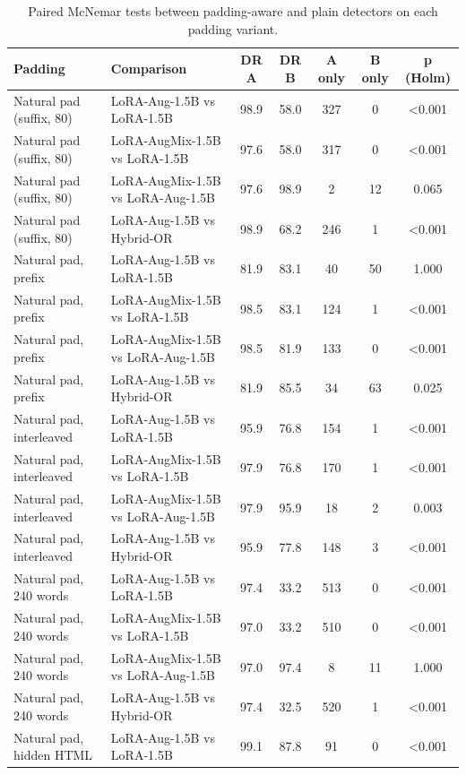 \begin{table}[t]
\centering
\caption{Paired McNemar tests between padding-aware and plain detectors on each padding variant.}
\label{tab:oodmcn}
\footnotesize
\begin{tabular}{llccccc}
\toprule
\textbf{Padding} & \textbf{Comparison} & \textbf{DR A} & \textbf{DR B} & \textbf{A only} & \textbf{B only} & \textbf{p (Holm)} \\
\midrule
Natural pad (suffix, 80) & LoRA-Aug-1.5B vs LoRA-1.5B & 98.9 & 58.0 & 327 & 0 & <0.001 \\
Natural pad (suffix, 80) & LoRA-AugMix-1.5B vs LoRA-1.5B & 97.6 & 58.0 & 317 & 0 & <0.001 \\
Natural pad (suffix, 80) & LoRA-AugMix-1.5B vs LoRA-Aug-1.5B & 97.6 & 98.9 & 2 & 12 & 0.065 \\
Natural pad (suffix, 80) & LoRA-Aug-1.5B vs Hybrid-OR & 98.9 & 68.2 & 246 & 1 & <0.001 \\
Natural pad, prefix & LoRA-Aug-1.5B vs LoRA-1.5B & 81.9 & 83.1 & 40 & 50 & 1.000 \\
Natural pad, prefix & LoRA-AugMix-1.5B vs LoRA-1.5B & 98.5 & 83.1 & 124 & 1 & <0.001 \\
Natural pad, prefix & LoRA-AugMix-1.5B vs LoRA-Aug-1.5B & 98.5 & 81.9 & 133 & 0 & <0.001 \\
Natural pad, prefix & LoRA-Aug-1.5B vs Hybrid-OR & 81.9 & 85.5 & 34 & 63 & 0.025 \\
Natural pad, interleaved & LoRA-Aug-1.5B vs LoRA-1.5B & 95.9 & 76.8 & 154 & 1 & <0.001 \\
Natural pad, interleaved & LoRA-AugMix-1.5B vs LoRA-1.5B & 97.9 & 76.8 & 170 & 1 & <0.001 \\
Natural pad, interleaved & LoRA-AugMix-1.5B vs LoRA-Aug-1.5B & 97.9 & 95.9 & 18 & 2 & 0.003 \\
Natural pad, interleaved & LoRA-Aug-1.5B vs Hybrid-OR & 95.9 & 77.8 & 148 & 3 & <0.001 \\
Natural pad, 240 words & LoRA-Aug-1.5B vs LoRA-1.5B & 97.4 & 33.2 & 513 & 0 & <0.001 \\
Natural pad, 240 words & LoRA-AugMix-1.5B vs LoRA-1.5B & 97.0 & 33.2 & 510 & 0 & <0.001 \\
Natural pad, 240 words & LoRA-AugMix-1.5B vs LoRA-Aug-1.5B & 97.0 & 97.4 & 8 & 11 & 1.000 \\
Natural pad, 240 words & LoRA-Aug-1.5B vs Hybrid-OR & 97.4 & 32.5 & 520 & 1 & <0.001 \\
Natural pad, hidden HTML & LoRA-Aug-1.5B vs LoRA-1.5B & 99.1 & 87.8 & 91 & 0 & <0.001 \\

\end{tabular}
\end{table}
